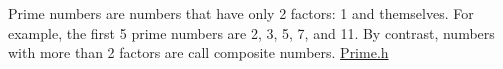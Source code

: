 Prime numbers are numbers that have only 2 factors\+: 1 and themselves. For example, the first 5 prime numbers are 2, 3, 5, 7, and 11. By contrast, numbers with more than 2 factors are call composite numbers. \mbox{\hyperlink{_prime_8h}{Prime.\+h}} 